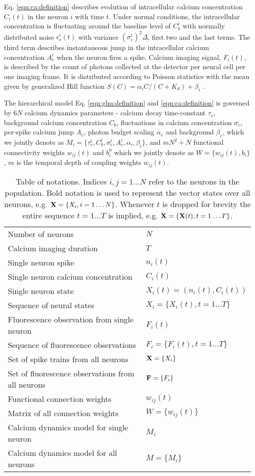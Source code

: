 Eq. \eqref{eqn:ca:definition} describes evolution of intracellular calcium concentration $C_i(t)$ in the neuron $i$ with time $t$. Under normal conditions, the intracellular concentration is fluctuating around the baseline level of $C^i_b$ with normally distributed noise $\epsilon^i_c(t)$ with variance $(\sigma^i_c)^2\Delta$, first two and the last terms.  The third term describes instantaneous jump in the intracellular calcium concentration $A^i_c$ when the neuron fires a spike.  Calcium imaging signal, $F_i(t)$, is described by the count of photons collected at the detector per neural cell per one imaging frame. It is distributed according to Poisson statistics with the mean given by generalized Hill function $S(C)=\alpha_i C/(C+K_d) + \beta_i$ \cite{Yasuda2004}.

The hierarchical model Eq. \eqref{eqn:glm:definition} and \eqref{eqn:ca:definition} is governed by $6N$ calcium dynamics parameters - calcium decay time-constant $\tau_c$, background calcium concentration $C_{b}$, fluctuations in calcium concentration $\sigma_c$, per-spike calcium jump $A_c$, photon budget scaling $\alpha_c$ and background $\beta_c$, which we jointly denote as $M_i=\{\tau^i_c, C^i_{b}, \sigma^i_c, A^i_c, \alpha_i, \beta_i\}$, and $m N^2 + N$ functional connectivity weights $w_{ij}(t)$ and $b^0_i$ which we jointly denote as $W=\{w_{ij}(t), b_i\}$, $m$ is the temporal depth of coupling weights $w_{ij}(t)$.


\begin{table}[h!b!p!]
\caption{Table of notations. Indices $i, j=1\ldots N$ refer to the neurons in the population. Bold notation is used to represent the vector states over all neurons, e.g. ${\bf X}=\{X_i, i=1\ldots N\}$. Whenever $t$ is dropped for brevity the entire sequence $t=1\ldots T$ is implied, e.g. ${\bf X}=\{{\bf X}(t), t=1\ldots T\}$.}
\label{table:notation}
\begin{tabular}{ll}
Number of neurons         & $N$ \\
Calcium imaging duration & $T$ \\
Single neuron spike & $n_i(t)$ \\
Single neuron calcium concentration & $C_i(t)$ \\
Single neuron state & $X_i(t)=(n_i(t), C_i(t))$ \\
Sequence of neural states & $X_i=\{X_i(t), t=1\ldots T\}$ \\
Fluorescence observation from single neuron & $F_i(t)$ \\
Sequence of fluorescence observations & $F_i=\{F_i(t), t=1\ldots T\}$ \\
Set of spike trains from all neurons   & ${\bf X}=\{X_i\}$ \\
Set of fluorescence observations from all neurons & ${\bf F}=\{F_i\}$ \\
Functional connection weights & $w_{ij}(t)$ \\
Matrix of all connection weights & $W=\{w_{ij}(t)\}$ \\
Calcium dynamics model for single neuron & $M_i$ \\
Calcium dynamics model for all neurons & $M=\{M_i\}$
\end{tabular}
\end{table}